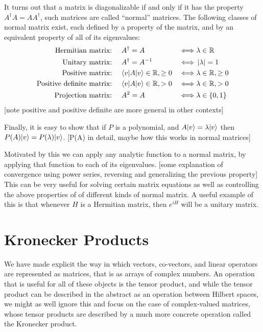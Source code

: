 It turns out that a matrix is diagonalizable if and only if it has the property $A^\dagger A = AA^\dagger$, such matrices are called ``normal'' matrices. The following classes of normal matrix exist, each defined by a property of the matrix, and by an equivalent property of all of its eigenvalues:
\begin{align*}
	\text{Hermitian matrix:\ }&&& A^\dagger = A & \iff& \lambda \in \mathbb{R} \\
	\text{Unitary matrix:\ }&&& A^\dagger = A^{-1} & \iff& \left| \lambda \right|=1 \\
	\text{Positive matrix:\ }&&& \langle v |A| v \rangle \in \mathbb{R}, \geq 0 & \iff& \lambda \in \mathbb{R}, \geq 0 \\
	\text{Positive definite matrix:\ }&&& \langle v |A| v \rangle \in \mathbb{R}, > 0 & \iff& \lambda \in \mathbb{R}, > 0 \\
	\text{Projection matrix:\ }&&& A^2 = A & \iff& \lambda \in \{0, 1\} \\
\end{align*}
[note positive and positive definite are more general in other contexts]

Finally, it is easy to show that if $P$ is a polynomial, and $A| v \rangle = \lambda| v \rangle$ then $P(A)| v \rangle = P(\lambda)| v \rangle$. [P(A) in detail, maybe how this works in normal matrices]

Motivated by this we can apply any analytic function to a normal matrix, by applying that function to each of its eigenvalues. [some explanation of convergence using power series, reversing  and generalizing the previous property] This can be very useful for solving certain matrix equations as well as controlling the above properties of of different kinds of normal matrix. A useful example of this is that whenever $H$ is a Hermitian matrix, then $e^{iH}$ will be a unitary matrix.

\section{Kronecker Products}
We have made explicit the way in which vectors, co-vectors, and linear operators are represented as matrices, that is as arrays of complex numbers. An operation that is useful for all of these objects is the tensor product, and while the tensor product can be described in the abstract as an operation between Hilbert spaces, we might as well ignore this and focus on the case of complex-valued matrices, whose tensor products are described by a much more concrete operation called the Kronecker product.

